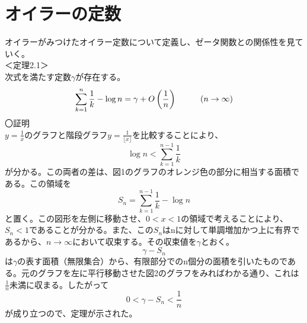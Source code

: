 \documentclass{jsarticle}
\begin{document}
\setcounter{equation}{0}
\section{オイラーの定数}
オイラーがみつけたオイラー定数について定義し、ゼータ関数との関係性を見ていく。\\
＜定理2.1＞\\
次式を満たす定数\(\gamma\)が存在する。
\begin{equation}
\sum_{k=1}^{n}\frac{1}{k}-\log n=\gamma+O\left(\frac{1}{n}\right)\hspace{10mm}(n\rightarrow\infty)
\end{equation}
〇証明\\
\(y=\frac{1}{x}\)のグラフと階段グラフ\(y=\frac{1}{\lfloor x\rfloor}\)を比較することにより、
\[\log n<\sum_{k=1}^{n-1}\frac{1}{k}\]
が分かる。この両者の差は、図1のグラフのオレンジ色の部分に相当する面積である。この領域を
\[S_{n}=\sum_{k=1}^{n-1}\frac{1}{k}-\log n\]
と置く。この図形を左側に移動させ、\(0<x<1\)の領域で考えることにより、\(S_{n}<1\)であることが分かる。また、この\(S_{n}\)はnに対して単調増加かつ上に有界であるから、\(n\rightarrow\infty\)において収束する。その収束値を\(\gamma\)とおく。
\[\gamma-S_{n}\]は\(\gamma\)の表す面積（無限集合）から、有限部分でのn個分の面積を引いたものである。元のグラフを左に平行移動させた図2のグラフをみればわかる通り、これは\(\frac{1}{n}\)未満に収まる。したがって
\[0<\gamma-S_{n}<\frac{1}{n}\]
が成り立つので、定理が示された。
\end{document}
